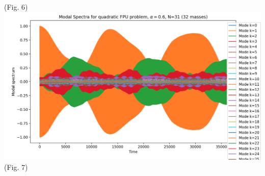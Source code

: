 \documentclass{article}
\begin{document}
\begin{center}
    (Fig. 6)\\ 
    \includegraphics[scale=.36]{modea6k1.png}\\ 
    (Fig. 7)
\end{center} 
\end{document}

